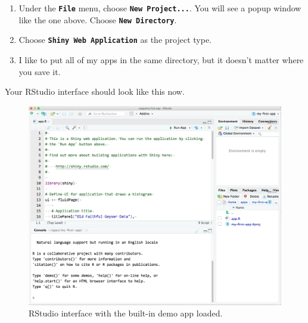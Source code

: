 \documentclass[
  oneside]{book}
\begin{document}
\begin{enumerate}
\def\labelenumi{\arabic{enumi}.}
\item
  Under the \textbf{\texttt{File}} menu, choose \textbf{\texttt{New\ Project...}}. You will see a popup window like the one above. Choose \textbf{\texttt{New\ Directory}}.
\item
  Choose \textbf{\texttt{Shiny\ Web\ Application}} as the project type.
\item
  I like to put all of my apps in the same directory, but it doesn't matter where you save it.
\end{enumerate}

Your RStudio interface should look like this now.

\begin{figure}

{\centering \includegraphics[width=1\linewidth]{images/demo_app/04-rstudio-interface} 

}

\caption{RStudio interface with the built-in demo app loaded.}\label{fig:first-rstudio-interface}
\end{figure}
\end{document}

